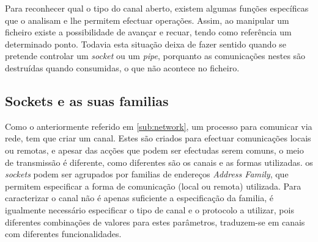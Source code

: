 
Para reconhecer qual o tipo do canal aberto, existem algumas funções específicas que o analisam e lhe permitem efectuar operações.
Assim, ao manipular um ficheiro existe a possibilidade de avançar e recuar, tendo como referência um determinado ponto.
Todavia esta situação deixa de fazer sentido quando se pretende controlar um \textit{socket} ou um \textit{pipe}, porquanto as comunicações nestes são destruídas quando consumidas, o que não acontece no ficheiro.
 




\subsection{Sockets e as suas familias}
\label{sub:sockets}



Como o anteriormente referido em \ref{sub:network}, um processo para comunicar via rede, tem que criar um canal.
Estes são criados para efectuar comunicações locais ou remotas, e apesar das acções que podem ser efectudas serem comuns, o meio de transmissão é diferente, como diferentes são os canais e as formas utilizadas.
os \textit{sockets} podem ser agrupados por familias de endereços \textit{Address Family}, que permitem especificar a forma de comunicação (local ou remota) utilizada.
Para caracterizar o canal não é apenas suficiente a especificação da familia, é igualmente necessário especificar o tipo de canal e o protocolo a utilizar, pois diferentes combinações de valores para estes parâmetros, traduzem-se em canais com diferentes funcionalidades.

